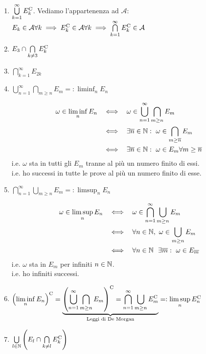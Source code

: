 \begin{enumerate}
	\item $\bigcup\limits _{k=1}^{\infty } E_{k}^{\mathrm{C}}$. Vediamo l'appartenenza ad $\mathcal{A}$: $E_{k} \in \mathcal{A} \forall k\implies  E_{k}^{\mathrm{C}} \in \mathcal{A} \forall k\implies  \bigcap\limits _{k=1}^{\infty } E_{k}^{\mathrm{C}} \in \mathcal{A}$
	\item $E_{3} \cap \bigcap\limits _{k\neq 3} E_{k}^{\mathrm{C}}$
	\item $\bigcap\limits _{k=1}^{\infty } E_{2k}$
	\item $\bigcup\limits _{n=1}^{\infty }\bigcap\limits _{m\geq n} E_{m} =:\liminf _{n} E_{n}$
	\begin{oss}
		\begin{align*}
			\omega \in \liminf_{n} E_{n} & \ \ \iff \ \ \omega \in \bigcup_{n=1}^{\infty }\bigcap_{m\geq n} E_{m}\\
			 & \ \ \iff \ \ \exists \overline{n} \in \mathbb{N} :\ \omega \in \bigcap_{m\geq \overline{n}} E_{m}\\
			 & \ \ \iff \ \ \exists \overline{n} \in \mathbb{N} :\ \omega \in E_{m} \forall m\geq \overline{n}
		\end{align*}
		i.e. $\omega $ sta in tutti gli $E_{m}$ tranne al più un numero finito di essi.\\
		i.e. ho successi in tutte le prove al più un numero finito di esse.
	\end{oss}
	\item $\bigcap\limits_{n=1}^{\infty }\bigcup\limits_{m\geq n} E_{m} =:\limsup_{n} E_{n}$
	\begin{oss}
		\begin{align*}
			\omega \in \limsup_{n} E_{n} & \ \ \iff \ \ \omega \in \bigcap_{n=1}^{\infty }\bigcup_{m\geq n} E_{m}\\
			 & \ \ \iff \ \ \forall n\in \mathbb{N} ,\ \omega \in \bigcup_{m\geq n} E_{m}\\
			 & \ \ \iff \ \ \forall n\in \mathbb{N} \ \ \exists \overline{m} :\ \omega \in E_{\overline{m}}
		\end{align*}
		i.e. $\omega $ sta in $E_{m}$ per infiniti $n\in \mathbb{N}$.\\
		i.e. ho infiniti successi.
	\end{oss}
	\item $\left(\liminf\limits _{n} E_{n}\right)^{\mathrm{C}} =\underbrace{\left(\bigcup\limits _{n=1}^{\infty }\bigcap\limits _{m\geq n} E_{m}\right)^{\mathrm{C}} =\bigcap\limits _{n=1}^{\infty }\bigcup\limits _{m\geq n} E_{m}^{\mathrm{C}}}_{\text{Leggi di De Morgan}} =:\limsup\limits _{n} E_{n}^{\mathrm{C}}$
	\item $\bigcup\limits _{l\in \mathbb{N}}\left(E_{l} \cap \bigcap\limits _{k\neq l} E_{k}^{\mathrm{C}}\right)$
\end{enumerate}

